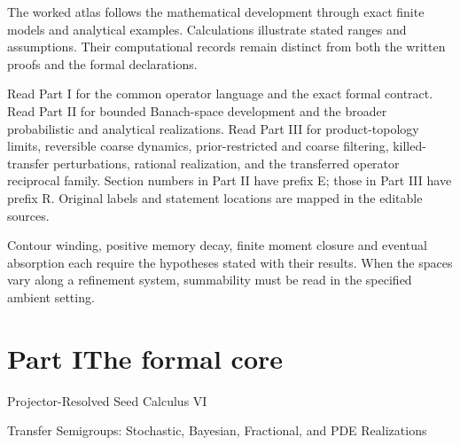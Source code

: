\documentclass[11pt,letterpaper]{article}
\theoremstyle{plain}
\theoremstyle{plain}
\theoremstyle{plain}
\theoremstyle{definition}
\theoremstyle{definition}
\theoremstyle{definition}
\theoremstyle{definition}
\theoremstyle{definition}
\theoremstyle{remark}
\theoremstyle{remark}
\theoremstyle{remark}
\theoremstyle{remark}
\theoremstyle{remark}
\theoremstyle{remark}
\begin{document}
The worked atlas follows the mathematical development through exact finite models and analytical examples. Calculations illustrate stated ranges and assumptions. Their computational records remain distinct from both the written proofs and the formal declarations.

Read Part I for the common operator language and the exact formal contract. Read Part II for bounded Banach-space development and the broader probabilistic and analytical realizations. Read Part III for product-topology limits, reversible coarse dynamics, prior-restricted and coarse filtering, killed-transfer perturbations, rational realization, and the transferred operator reciprocal family. Section numbers in Part II have prefix E; those in Part III have prefix R. Original labels and statement locations are mapped in the editable sources.

Contour winding, positive memory decay, finite moment closure and eventual absorption each require the hypotheses stated with their results. When the spaces vary along a refinement system, summability must be read in the specified ambient setting.
\clearpage
\tableofcontents
\clearpage
\listoffigures
\listoftables
\clearpage
{}
\part*{Part I\quad The formal core}
\begin{center}\large Projector-Resolved Seed Calculus VI\par\normalsize Transfer Semigroups: Stochastic, Bayesian, Fractional, and PDE Realizations\end{center}
\end{document}
